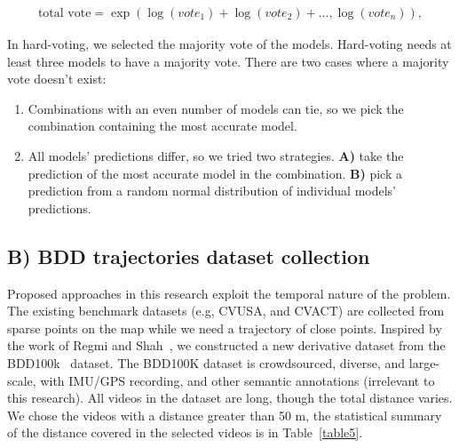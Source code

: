 \documentclass[10pt,letterpaper]{article}
\begin{document}
\begin{eqnarray}
\label{eq1}
\text{total vote} = \exp(\log(vote_1) + \log(vote_2) + ..., \log(vote_n)),
\end{eqnarray}

In hard-voting, we selected the majority vote of the models. Hard-voting needs at least three models to have a majority vote. There are two cases where a majority vote doesn’t exist:
\begin{enumerate}
  \item Combinations with an even number of models can tie, so we pick the combination containing the most accurate model.
  \item All models’ predictions differ, so we tried two strategies. {\bf A)} take the prediction of the most accurate model in the combination. {\bf B)} pick a prediction from a random normal distribution of individual models' predictions.
\end{enumerate}

\subsection*{B) BDD trajectories dataset collection}
Proposed approaches in this research exploit the temporal nature of the problem. The existing benchmark datasets (e.g, CVUSA, and CVACT) are collected from sparse points on the map while we need a trajectory of close points. Inspired by the work of Regmi and Shah~\cite{bib24}, we constructed a new derivative dataset from the BDD100k~\cite{bib12} dataset. The BDD100K dataset is crowdsourced, diverse, and large-scale, with IMU/GPS recording, and other semantic annotations (irrelevant to this research). All videos in the dataset are  long, though the total distance varies. We chose the videos with a distance greater than 50 m, the statistical summary of the distance covered in the selected videos is in Table~\ref{table5}.

\begin{table}[!ht]
  \centering
  \caption{
  {\bf A statistical summary of the distance covered in selected videos.}}
  \label{table5}
\end{table}
\end{document}
